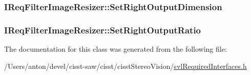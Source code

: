\subsubsection[{Set\+Right\+Output\+Dimension}]{ I\+Req\+Filter\+Image\+Resizer\+::\+Set\+Right\+Output\+Dimension}\label{class_i_req_filter_image_resizer_a7aa158be40abd90f5bff2f0f000a80e9}
\hypertarget{class_i_req_filter_image_resizer_af77849e0dac81b2ae79f64eed2485a2c}{}
\subsubsection[{Set\+Right\+Output\+Ratio}]{ I\+Req\+Filter\+Image\+Resizer\+::\+Set\+Right\+Output\+Ratio}\label{class_i_req_filter_image_resizer_af77849e0dac81b2ae79f64eed2485a2c}


The documentation for this class was generated from the following file\+:\begin{DoxyCompactItemize}
\item 
/\+Users/anton/devel/cisst-\/saw/cisst/cisst\+Stereo\+Vision/\hyperlink{svl_required_interfaces_8h}{svl\+Required\+Interfaces.\+h}\end{DoxyCompactItemize}
